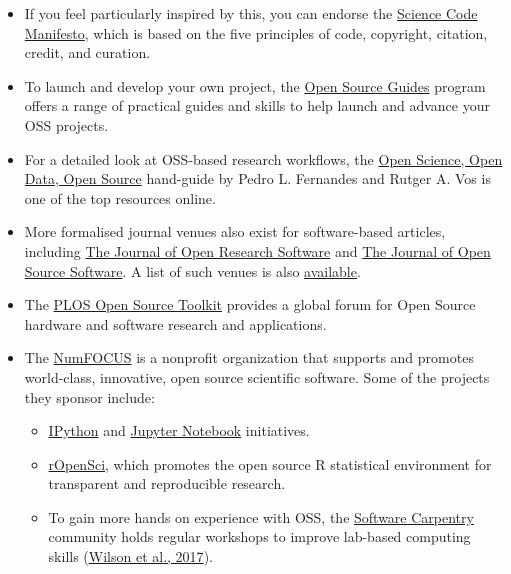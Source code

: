 \documentclass[]{book}
\begin{document}
\begin{itemize}
\item
  If you feel particularly inspired by this, you can endorse the \href{http://sciencecodemanifesto.org/}{Science Code Manifesto}, which is based on the five principles of code, copyright, citation, credit, and curation.
\item
  To launch and develop your own project, the \href{https://opensource.guide/}{Open Source Guides} program offers a range of practical guides and skills to help launch and advance your OSS projects.
\item
  For a detailed look at OSS-based research workflows, the \href{https://pfern.github.io/OSODOS/gitbook/}{Open Science, Open Data, Open Source} hand-guide by Pedro L. Fernandes and Rutger A. Vos is one of the top resources online.
\item
  More formalised journal venues also exist for software-based articles, including \href{https://openresearchsoftware.metajnl.com/}{The Journal of Open Research Software} and \href{https://joss.theoj.org/}{The Journal of Open Source Software}. A list of such venues is also \href{https://www.software.ac.uk/which-journals-should-i-publish-my-software}{available}.
\item
  The \href{https://channels.plos.org/open-source-toolkit}{PLOS Open Source Toolkit} provides a global forum for Open Source hardware and software research and applications.
\item
  The \href{http://www.numfocus.org}{NumFOCUS} is a nonprofit organization that supports and promotes world-class, innovative, open source scientific software. Some of the projects they sponsor include:

  \begin{itemize}
  \item
    \href{http://ipython.org}{IPython} and \href{https://jupyter.org}{Jupyter Notebook} initiatives.
  \item
    \href{http://ropensci.org}{rOpenSci}, which promotes the open source R statistical environment for transparent and reproducible research.
  \item
    To gain more hands on experience with OSS, the \href{https://software-carpentry.org/}{Software Carpentry} community holds regular workshops to improve lab-based computing skills (\href{https://github.com/OpenScienceMOOC/Module-5-Open-Research-Software-and-Open-Source/blob/master/Reading\%20Material_Open\%20Source\%20and\%20Open\%20Research\%20Software/Wilson\%20et\%20al.\%2C\%202017.pdf}{Wilson et al., 2017}).
  \end{itemize}
\end{itemize}
\end{document}
